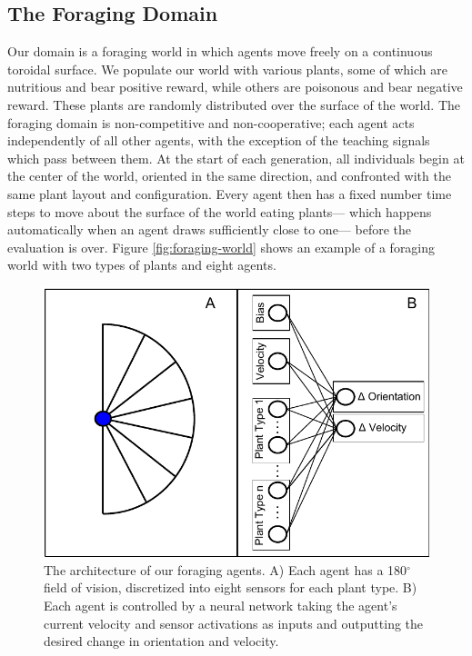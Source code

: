 \documentclass{acm_proc_article-sp}
\begin{document}
\subsection*{The Foraging Domain}
Our domain is a foraging world in which agents move freely on a continuous toroidal surface. We populate our world with various plants, some of which are nutritious and bear positive reward, while others are poisonous and bear negative reward. These plants are randomly distributed over the surface of the world. The foraging domain is non-competitive and non-cooperative; each agent acts independently of all other agents, with the exception of the teaching signals which pass between them. At the start of each generation, all individuals begin at the center of the world, oriented in the same direction, and confronted with the same plant layout and configuration. Every agent then has a fixed number time steps to move about the surface of the world eating plants--- which happens automatically when an agent draws sufficiently close to one--- before the evaluation is over. Figure \ref{fig:foraging-world} shows an example of a foraging world with two types of plants and eight agents.
    
\begin{figure}[t]
  \centering
    \includegraphics[scale=.65]{foraging_agent_architecture.pdf}
  \caption{The architecture of our foraging agents. A) Each agent has a 180$^{\circ}$ field of vision, discretized into eight sensors for each plant type. B) Each agent is controlled by a neural network taking the agent's current velocity and sensor activations as inputs and outputting the desired change in orientation and velocity.}
  \label{fig:agent-architecture}
\end{figure}
\end{document}
